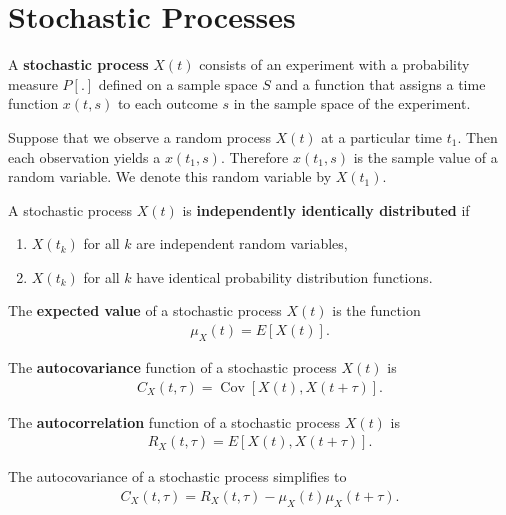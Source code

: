 \documentclass{memoir}
\newcommand{\Cov}{\operatorname{Cov}}
\begin{document}
\section{Stochastic Processes}

\begin{definition}
    A \textbf{stochastic process} $X(t)$ consists of an experiment with a probability measure $P[.]$ defined on a sample space $S$ and a function that assigns a time function $x(t,s)$ to each outcome $s$ in the sample space of the experiment.
\end{definition}

Suppose that we observe a random process $X(t)$ at a particular time $t_1$. Then each observation yields a $x(t_1,s)$. Therefore $x(t_1,s)$ is the sample value of a random variable. We denote this random variable by $X(t_1)$.

\begin{definition}
    A stochastic process $X(t)$ is \textbf{independently identically distributed} if
    \begin{enumerate}
        \item $X(t_k)$ for all $k$ are independent random variables,
        \item $X(t_k)$ for all $k$ have identical probability distribution functions.
    \end{enumerate}
\end{definition}    

\begin{definition}
    The \textbf{expected value} of a stochastic process $X(t)$ is the function
    \begin{align*}
        \mu_X(t) = E[X(t)].
    \end{align*}
\end{definition}

\begin{definition}
    The \textbf{autocovariance} function of a stochastic process $X(t)$ is
    \begin{align*}
        C_X(t,\tau)=\Cov[X(t),X(t+\tau)].
    \end{align*}
\end{definition}

\begin{definition}
    The \textbf{autocorrelation} function of a stochastic process $X(t)$ is
    \begin{align*}
        R_X(t,\tau)=E[X(t),X(t + \tau)].
    \end{align*}
\end{definition}
The autocovariance of a stochastic process simplifies to
\begin{align*}
    C_X(t,\tau) = R_X(t,\tau) - \mu_X(t) \mu_X(t + \tau).
\end{align*}
\end{document}
